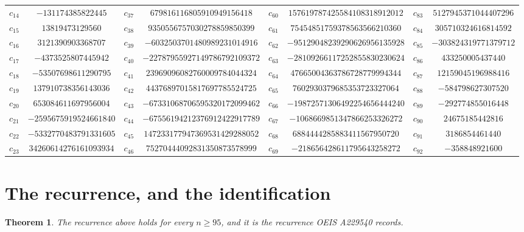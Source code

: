 \documentclass[11pt,a4paper]{article}
\theoremstyle{plain}
\newtheorem{theorem}{Theorem}
\theoremstyle{definition}
\begin{document}
\begin{center}
\begin{tabular}{cccccccc}
$c_{14}$ & $-131174385822445$ & $c_{37}$ & $679816116805910949156418$ & $c_{60}$ & $157619787425584108318912012$ & $c_{83}$ & $5127945371044407296$ \\
$c_{15}$ & $13819473129560$ & $c_{38}$ & $9350556757030278859850399$ & $c_{61}$ & $75454851759378563566210360$ & $c_{84}$ & $305710324616814592$ \\
$c_{16}$ & $3121390903368707$ & $c_{39}$ & $-6032503701480989231014916$ & $c_{62}$ & $-95129048239290626956135928$ & $c_{85}$ & $-303824319771379712$ \\
$c_{17}$ & $-4373525807445942$ & $c_{40}$ & $-22787955927149786792109372$ & $c_{63}$ & $-28109266117252855830230624$ & $c_{86}$ & $433250005437440$ \\
$c_{18}$ & $-53507698611290795$ & $c_{41}$ & $23969096082760009784044324$ & $c_{64}$ & $47665004363786728779994344$ & $c_{87}$ & $12159045196988416$ \\
$c_{19}$ & $137910738356143036$ & $c_{42}$ & $44376897015817697785524725$ & $c_{65}$ & $7602930379685353723327064$ & $c_{88}$ & $-584798627307520$ \\
$c_{20}$ & $653084611697956004$ & $c_{43}$ & $-67331068706595320172099462$ & $c_{66}$ & $-19872571306492254656444240$ & $c_{89}$ & $-292774855016448$ \\
$c_{21}$ & $-2595675919524661840$ & $c_{44}$ & $-67556194212376912422917789$ & $c_{67}$ & $-1068669851347866253326272$ & $c_{90}$ & $24675185442816$ \\
$c_{22}$ & $-5332770483791331605$ & $c_{45}$ & $147233177947369531429288052$ & $c_{68}$ & $6884444285883411567950720$ & $c_{91}$ & $3186854461440$ \\
$c_{23}$ & $34260614276161093934$ & $c_{46}$ & $75270444092831350873578999$ & $c_{69}$ & $-218656428611795643258272$ & $c_{92}$ & $-358848921600$ \\
\end{tabular}
\end{center}

\section{The recurrence, and the identification}

\begin{theorem}
The recurrence above holds for every $n\ge95$, and it is the recurrence OEIS A229540 records.
\end{theorem}
\end{document}
